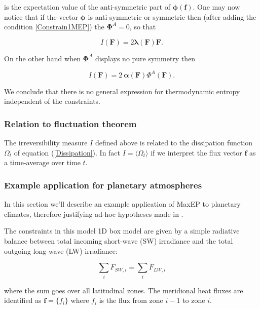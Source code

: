\documentclass[a4paper,12pt]{article}
\begin{document}
is the expectation value of the anti-symmetric part of $\bm{\phi}(\bm{f})$. One may now notice that if the vector $\bm{\phi}$ is anti-symmetric or symmetric then (after adding the condition \ref{Constrain1MEP}) the $\bm{\Phi}^A =0$, so that

\begin{equation}
\label{SymmetricIrreversible}
  I(\bm{F})=2 \bm{\lambda}(\bm{F})\bm{F}.
\end{equation}

On the other hand when $\bm{\Phi}^A$ displays no pure symmetry then

\begin{equation}
\label{NonSymmetricIrreversible}
  I(\bm{F}) = 2\ \bm{\alpha(\bm{F})} \Phi^A(\bm{F}).
\end{equation}

We conclude that there is no general expression for thermodynamic entropy independent of the constraints.

\subsubsection{Relation to fluctuation theorem}
The irreversibility measure $I$ defined above is related to the dissipation function $\Omega_t$ of equation (\ref{Dissipation}). In fact $I=\langle \Omega_t \rangle$ if we interpret the flux vector $\bm{f}$ as a time-average over time $t$.


\subsubsection{Example application for planetary atmospheres}

In this section we'll describe an example application of MaxEP to planetary climates, therefore justifying ad-hoc hypotheses made in \cite{Paltridge:2007jf}\cite{Lorenz:J80tzZkl}.

The constraints in this model 1D box model are given by a simple radiative balance between total incoming short-wave (SW) irradiance and the total outgoing long-wave (LW) irradiance:

\begin{equation}
\label{BalanceEq}
  \sum_i F_{SW,i}= \sum_i F_{LW,i}
\end{equation}
  
  where the sum goes over all latitudinal zones. The meridional heat fluxes are identified as $\bm{f}=\{f_i\}$ where $f_i$ is the flux from zone $i-1$ to zone $i$. 
\end{document}
